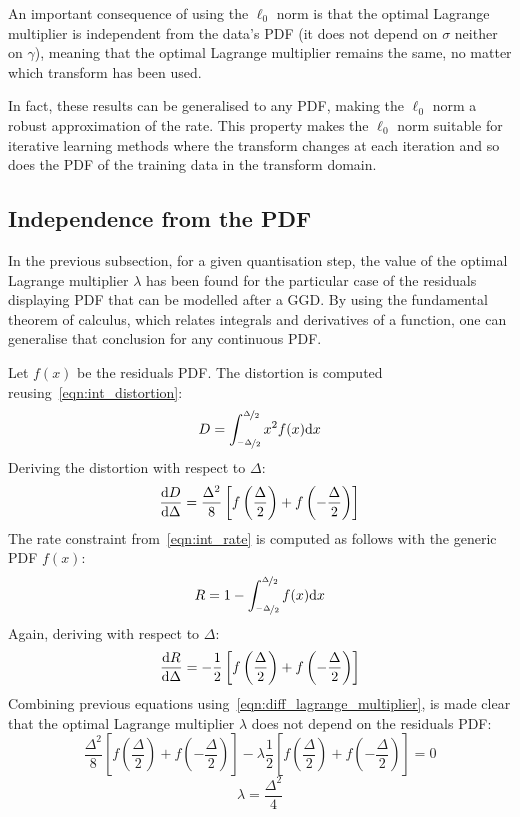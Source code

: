\documentclass[11pt,a4paper,openright,twoside]{book}
\numberwithin{equation}{section} %
\numberwithin{figure}{section} %
\numberwithin{table}{section} %
\begin{document}
An important consequence of using the $\ell_0$ norm is that the optimal
Lagrange multiplier is independent from the data's \ac{PDF} (it does
not depend on $\sigma$ neither on $\gamma$), meaning that the optimal
Lagrange multiplier remains the same, no matter which transform has been
used.

In fact, these results can be generalised to any \ac{PDF}, making the
$\ell_0$ norm a robust approximation of the rate.
This property makes the $\ell_0$ norm suitable for iterative learning methods
where the transform changes at each iteration and so does the \ac{PDF} of the
training data in the transform domain.

\subsection{Independence from the \acs{PDF}}
\label{sub:independence_from_the_pdf}

In the previous subsection, for a given quantisation step, the value of
the optimal Lagrange multiplier $\lambda$ has been found for the particular
case of the residuals displaying \ac{PDF} that can be modelled after a
\ac{GGD}.
By using the fundamental theorem of calculus, which relates integrals
and derivatives of a function, one can generalise that conclusion for
any continuous \ac{PDF}.

Let $f(x)$ be the residuals \ac{PDF}.
The distortion is computed reusing~\eqref{eqn:int_distortion}:
\begin{equation}
	D = \int_{\nicefrac{-\Delta}{2}}^{\nicefrac{\Delta}{2}} x^2 f(x) \text{d} x
\end{equation}
Deriving the distortion with respect to $\Delta$:
\begin{equation}
	\frac{\text{d} D}{\text{d} \Delta} =
	\frac{\Delta^2}{8}\left[
	f\left(\frac{\Delta}{2}\right)+f\left(-\frac{\Delta}{2}\right)\right]
\end{equation}
The rate constraint from~\eqref{eqn:int_rate} is computed as
follows with the generic \ac{PDF}
$f(x)$:
\begin{equation}
	R = 1 - \int_{\nicefrac{-\Delta}{2}}^{\nicefrac{\Delta}{2}} f(x) \text{d} x\\
\end{equation}
Again, deriving with respect to $\Delta$:
\begin{equation}
	\frac{\text{d} R}{\text{d} \Delta} =
	-\frac{1}{2}\left[
	f\left(\frac{\Delta}{2}\right)+
	f\left(-\frac{\Delta}{2}\right)\right]
\end{equation}
Combining previous equations using~\eqref{eqn:diff_lagrange_multiplier},
is made clear that the optimal Lagrange multiplier $\lambda$ does not depend
on the residuals \ac{PDF}:
\begin{equation}
	\frac{\Delta^2}{8}\left[
	f\left(\frac{\Delta}{2}\right)+f\left(-\frac{\Delta}{2}\right)\right]
	- \lambda
	\frac{1}{2}\left[
	f\left(\frac{\Delta}{2}\right)+
	f\left(-\frac{\Delta}{2}\right)\right] = 0
\end{equation}
\begin{equation}
	\boxed{\lambda = \frac{\Delta^2}{4}}
\end{equation}
\end{document}
